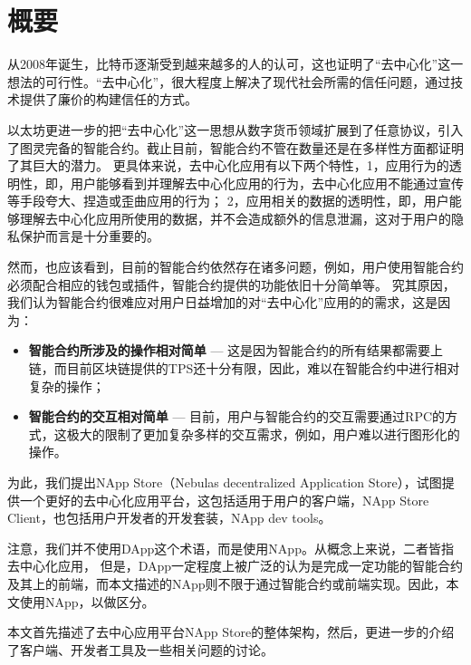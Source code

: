 \section{概要}
从2008年诞生，比特币逐渐受到越来越多的人的认可，这也证明了``去中心化''这一想法的可行性。``去中心化''，很大程度上解决了现代社会所需的信任问题，通过技术提供了廉价的构建信任的方式。

以太坊更进一步的把``去中心化''这一思想从数字货币领域扩展到了任意协议，引入了图灵完备的智能合约。截止目前，智能合约不管在数量还是在多样性方面都证明了其巨大的潜力。
更具体来说，去中心化应用有以下两个特性，1，应用行为的透明性，即，用户能够看到并理解去中心化应用的行为，去中心化应用不能通过宣传等手段夸大、捏造或歪曲应用的行为；
2，应用相关的数据的透明性，即，用户能够理解去中心化应用所使用的数据，并不会造成额外的信息泄漏，这对于用户的隐私保护而言是十分重要的。

然而，也应该看到，目前的智能合约依然存在诸多问题，例如，用户使用智能合约必须配合相应的钱包或插件，智能合约提供的功能依旧十分简单等。
究其原因，我们认为智能合约很难应对用户日益增加的对``去中心化''应用的的需求，这是因为：
\begin{itemize}
\item \textbf{智能合约所涉及的操作相对简单} --- 这是因为智能合约的所有结果都需要上链，而目前区块链提供的TPS还十分有限，因此，难以在智能合约中进行相对复杂的操作；
\item \textbf{智能合约的交互相对简单} --- 目前，用户与智能合约的交互需要通过RPC的方式，这极大的限制了更加复杂多样的交互需求，例如，用户难以进行图形化的操作。
\end{itemize}

为此，我们提出NApp Store（Nebulas decentralized Application Store），试图提供一个更好的去中心化应用平台，这包括适用于用户的客户端，NApp Store Client，也包括用户开发者的开发套装，NApp dev tools。

注意，我们并不使用DApp这个术语，而是使用NApp。从概念上来说，二者皆指去中心化应用，
但是，DApp一定程度上被广泛的认为是完成一定功能的智能合约及其上的前端，而本文描述的NApp则不限于通过智能合约或前端实现。因此，本文使用NApp，以做区分。

本文首先描述了去中心应用平台NApp Store的整体架构，然后，更进一步的介绍了客户端、开发者工具及一些相关问题的讨论。


